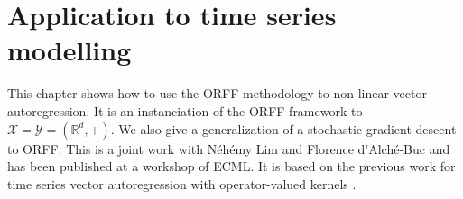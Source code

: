 \chapter{Application to time series modelling} %
\label{ch:applications}
\bigskip
\begin{justify}
    This chapter shows how to use the \acs{ORFF} methodology to non-linear
    vector autoregression. It is an instanciation of the \acs{ORFF} framework
    to $\mathcal{X}=\mathcal{Y}=(\mathbb{R}^d, +)$. We also give a
    generalization of a stochastic gradient descent \citep{dai2014scalable} to
    \acs{ORFF}. This is a joint work with N\'eh\'emy Lim and Florence
    d'Alch\'e-Buc and has been published at a workshop of \acs{ECML}. It is
    based on the previous work \citet{Lim2015} for time series vector
    autoregression with operator-valued kernels \cite{brault2016scaling}.
\end{justify}
\minitoc

